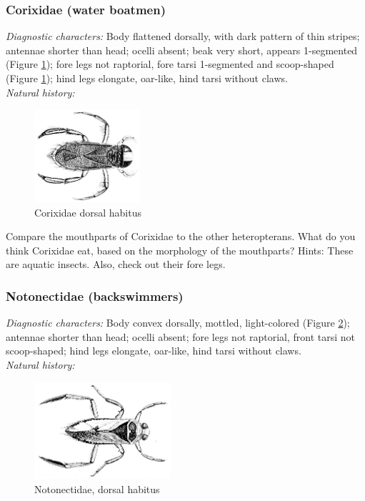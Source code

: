 \documentclass[letterpaper, 11pt]{article}
\begin{document}
\subsubsection{Corixidae (water boatmen)}
\noindent{}\textit{Diagnostic characters:} Body flattened dorsally, with dark pattern of thin stripes; antennae shorter than head; ocelli absent; beak very short, appears 1-segmented (Figure \ref{fig:corix1}); fore legs not raptorial, fore tarsi 1-segmented and scoop-shaped (Figure \ref{fig:corix1}); hind legs elongate, oar-like, hind tarsi without claws.\\

\noindent{}\textit{Natural history:} \\

\begin{figure}[ht!]
 \centering
 \includegraphics[width=0.35\textwidth]{CorixidHabitus}
 \caption{Corixidae dorsal habitus \citep[][Plate 7, Fig. 5]{bhl37902}}
 \label{fig:corix1}
\end{figure}

\noindent{}Compare the mouthparts of Corixidae to the other heteropterans. What do you think Corixidae eat, based on the morphology of the mouthparts? Hints: These are aquatic insects. Also, check out their fore legs.\vspace{2cm}

\subsubsection{Notonectidae (backswimmers)}
\noindent{}\textit{Diagnostic characters:} Body convex dorsally, mottled, light-colored (Figure \ref{fig:notonect1}); antennae shorter than head; ocelli absent; fore legs not raptorial, front tarsi not scoop-shaped; hind legs elongate, oar-like, hind tarsi without claws.\\

\noindent{}\textit{Natural history:} \\

\begin{figure}[ht!]
 \centering
 \includegraphics[width=0.45\textwidth]{NotonectidHabitus}
 \caption{Notonectidae, dorsal habitus \citep[][Plate 7, Fig. 2]{bhl37902}}
 \label{fig:notonect1}
\end{figure}
\end{document}
